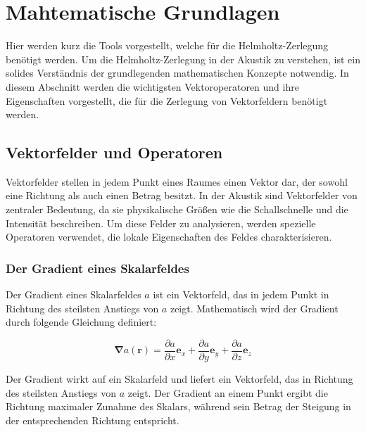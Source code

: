 %
%
%
%
\section{Mahtematische Grundlagen
\label{helmholtz:section:Mahtematische_Grundlagen}}

Hier werden kurz die Tools vorgestellt, welche für die Helmholtz-Zerlegung benötigt werden. Um die Helmholtz-Zerlegung in der Akustik zu verstehen, ist ein solides Verständnis der grundlegenden mathematischen Konzepte notwendig. In diesem Abschnitt werden die wichtigsten Vektoroperatoren und ihre Eigenschaften vorgestellt, die für die Zerlegung von Vektorfeldern benötigt werden.

\subsection{Vektorfelder und Operatoren
\label{helmholtz:subsection:Vektorfelder_Operatoren}}

Vektorfelder stellen in jedem Punkt eines Raumes einen Vektor dar, der sowohl eine Richtung als auch einen Betrag besitzt. In der Akustik sind Vektorfelder von zentraler Bedeutung, da sie physikalische Größen wie die Schallschnelle und die Intensität beschreiben. Um diese Felder zu analysieren, werden spezielle Operatoren verwendet, die lokale Eigenschaften des Feldes charakterisieren.

\subsubsection{Der Gradient eines Skalarfeldes}

Der Gradient eines Skalarfeldes $a$ ist ein Vektorfeld, das in jedem Punkt in Richtung des steilsten Anstiegs von $a$ zeigt. Mathematisch wird der Gradient durch folgende Gleichung definiert:

\begin{equation}
\mathbf{\nabla} a (\mathbf{r}) = \frac{\partial a}{\partial x}\mathbf{e}_x + \frac{\partial a}{\partial y}\mathbf{e}_y + \frac{\partial a}{\partial z}\mathbf{e}_z
\end{equation}

Der Gradient wirkt auf ein Skalarfeld und liefert ein Vektorfeld, das in Richtung des steilsten Anstiegs von $a$ zeigt. Der Gradient an einem Punkt ergibt die Richtung maximaler Zunahme des Skalars, während sein Betrag der Steigung in der entsprechenden Richtung entspricht.

